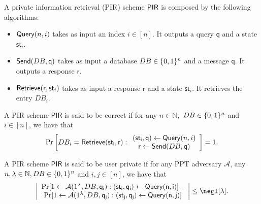 \begin{definition}[PIR]
A private information retrieval (PIR) scheme $\mathsf{PIR}$ is composed by the following algorithms: %
\begin{itemize}
    \item $\mathsf{Query}(n,i)$ takes as input an index $i\in [n]$. It outputs a query $\mathsf{q}$ and a state $\mathsf{st}_i$.
    \item $\mathsf{Send}(DB,\mathsf{q})$  takes as input a database $DB\in\{0,1\}^n$ and a message $\mathsf{q}$. It outputs a response $\mathsf{r}$.
    \item $\mathsf{Retrieve}(\mathsf{r},\mathsf{st}_i)$ takes as input a response $\mathsf{r}$ and a state $\mathsf{st}_i$. It retrieves the entry $DB_i$.
\end{itemize}

\end{definition}

\begin{definition}[Correctness]
A PIR scheme $\mathsf{PIR}$ is said to be correct if 
for any $n\in \mathbb{N},$ $DB\in\{0,1\}^n$ and $i\in[n]$, we have that
$$
\Pr\left[DB_i=\mathsf{Retrieve}(\mathsf{st_i},\mathsf{r}):\begin{array}{c}
     (\mathsf{st_i},\mathsf{q})\gets\mathsf{Query}(n,i) \\
    \mathsf{r}\gets\mathsf{Send}(DB,\mathsf{q})
\end{array}\right]=1.
$$
\end{definition}

\begin{definition}
A PIR scheme $\mathsf{PIR}$ is said to be user private if for any PPT adversary $\mathcal{A}$, any $n,\lambda\in \mathbb{N}, DB\in\{0,1\}^n$ and $i,j\in[n]$, we have that
\begin{equation*}
\left| \begin{array}{c}
     \Pr[1\gets\mathcal{A}(1^\lambda,DB,\mathsf{q_i}): (\mathsf{st_i,\mathsf{q_i})\gets\query(n,i)}] -  \\
     \Pr[1\gets\mathcal{A}(1^\lambda,DB,\mathsf{q_j}):(\mathsf{st_j,\mathsf{q_j})\gets\query(n,j)}]
\end{array} \right|\le \negl[\lambda].
\end{equation*}
\end{definition}


